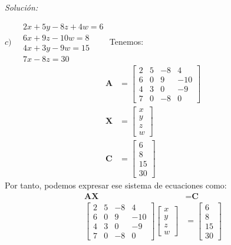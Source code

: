 \documentclass[12pt]{article}
\newenvironment{sol}
    {\emph{Solución:}
    }
    {
    }
\begin{document}
\begin{sol}
$
c) \quad
\begin{matrix}
2x+5y-8z+4w = 6\\
6x + 9z -10w =8 \\
4x +3y -9w = 15 \\
7x - 8z =30
\end{matrix}
$
Tenemos:
\begin{align*}
\textbf{A} &=
\begin{bmatrix}
2 & 5 & -8 & 4 \\ 
6 & 0 & 9 & -10 \\
4 & 3 & 0 & -9 \\
7 & 0 & -8 & 0
\end{bmatrix} 
\\
\textbf{X} &=
\begin{bmatrix}
x \\
y\\
z\\
w
\end{bmatrix}
\\
\textbf{C} &= 
\begin{bmatrix}
6\\
8\\
15\\
30
\end{bmatrix}
\end{align*}
Por tanto, podemos expresar ese sistema de ecuaciones como: 
\begin{align*}
\textbf{AX} &= \textbf{C} \\
\begin{bmatrix}
2 & 5 & -8 & 4 \\ 
6 & 0 & 9 & -10 \\
4 & 3 & 0 & -9 \\
7 & 0 & -8 & 0
\end{bmatrix}  
\begin{bmatrix}
x \\
y\\
z\\
w
\end{bmatrix}
&=
\begin{bmatrix}
6\\
8\\
15\\
30
\end{bmatrix}
\end{align*}

\end{sol}

\pagebreak
\end{document}
